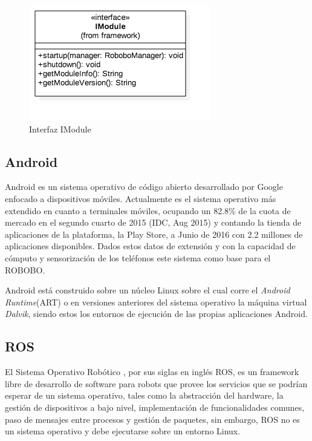 \begin{figure}
	\centering
	\includegraphics[width=0.5\linewidth]{imagenes/diagramas/IModule.png}
	\caption{Interfaz IModule}
	\label{fig:imodule}
\end{figure}
\subsection{Android}
\label{subsec:android}


Android es un sistema operativo de código abierto desarrollado por Google enfocado a dispositivos móviles. Actualmente es el sistema operativo más extendido en cuanto a terminales móviles, ocupando un 82.8\% de la cuota de mercado en el segundo cuarto de 2015 (IDC, Aug 2015) y contando la tienda de aplicaciones de la plataforma, la  Play Store, a Junio de 2016 con 2.2 millones de aplicaciones disponibles.
Dados estos datos de extensión y con la capacidad de cómputo y sensorización de los teléfonos  este sistema como base para el ROBOBO.

Android está construido sobre un núcleo Linux sobre el cual corre el \textit{Android Runtime}(ART) o en versiones anteriores del sistema operativo la máquina virtual \textit{Dalvik}, siendo estos los entornos de ejecución de las propias aplicaciones Android.


\subsection{ROS}
\label{subsec:ros}

El Sistema Operativo Robótico\cite{Ros} , por sus siglas en inglés ROS, es un framework libre de desarrollo de software para robots que provee los servicios que se podrían esperar de un sistema operativo, tales como la abstracción del hardware, la gestión de dispositivos a bajo nivel, implementación de funcionalidades comunes, paso de mensajes entre procesos y gestión de paquetes, sin embargo, ROS no es un sistema operativo y debe ejecutarse sobre un entorno Linux.
	
